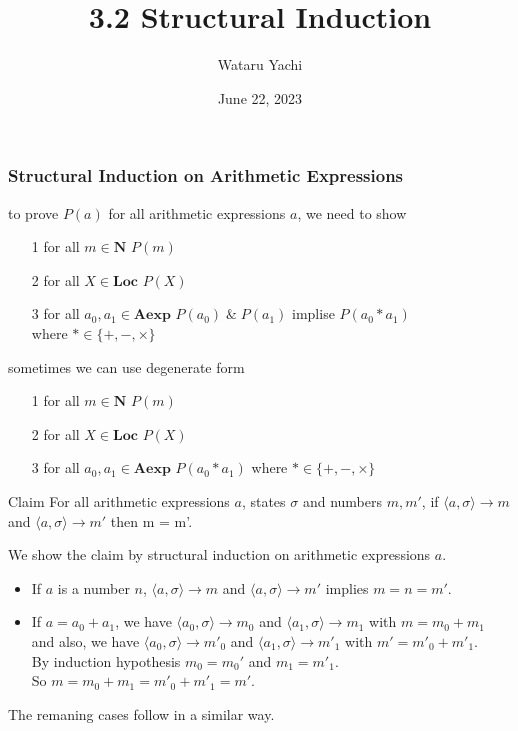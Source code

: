 \documentclass[12pt,aspectratio=169]{beamer}
\title{3.2 Structural Induction}
\author{Wataru Yachi}
\institute{JAIST}
\date{June 22, 2023}
\newcommand{\cmd}[3]{\langle #1, #2 \rangle \to #3}
\begin{document}
\maketitle

\begin{frame}
    \frametitle{Structural Induction on Arithmetic Expressions}
    to prove $P(a)$ for all arithmetic expressions $a$, we need to show
    \pause
    \begin{itemize}[<+->]
        \item [1] for all $m \in \mathbf{N}$ $P(m)$
        \item [2] for all $X \in \mathbf{Loc}$ $P(X)$
        \item [3] for all $a_0, a_1 \in \mathbf{Aexp}$ $P(a_0)\; \& \; P(a_1)$ implise $P(a_0 * a_1)$ \\
            where $* \in \{+, -, \times\}$
    \end{itemize}
    \pause
    sometimes we can use degenerate form
    \pause
    \begin{itemize}[<+->]
        \item [1] for all $m \in \mathbf{N}$ $P(m)$
        \item [2] for all $X \in \mathbf{Loc}$ $P(X)$
        \item [3] for all $a_0, a_1 \in \mathbf{Aexp}$ $P(a_0 * a_1)$ where $* \in \{+, -, \times\}$
    \end{itemize}

\end{frame}

\begin{frame}
    \begin{block}{Claim}
        For all arithmetic expressions $a$, states $\sigma$
        and numbers $m, m'$,
        if $\langle a, \sigma \rangle \to m$ and $\langle a, \sigma \rangle \to m'$ then m = m'.
    \end{block}
    \pause

    \begin{Proof}
        We show the claim by structural induction on arithmetic expressions $a$.

        \pause

        \begin{itemize}[<+->]
            \item If $a$ is a number $n$, $\cmd{a}{\sigma}{m}$ and $\cmd{a}{\sigma}{m'}$ implies $m = n = m'$.
            \item If $a = a_0 + a_1$, we have $\cmd{a_0}{\sigma}{m_0}$ and $\cmd{a_1}{\sigma}{m_1}$ with $ m = m_0 + m_1$
                and also, we have $\cmd{a_0}{\sigma}{m'_0}$ and $\cmd{a_1}{\sigma}{m'_1}$ with $ m' = m'_0 + m'_1$.\\ 
                By induction hypothesis $m_0 = m_0'$ and $m_1 = m'_1$.\\
                So $ m = m_0 + m_1 = m'_0 + m'_1 = m'$.
        \end{itemize}
        \pause
        The remaning cases follow in a similar way.
    \end{Proof}
\end{frame}
\end{document}

